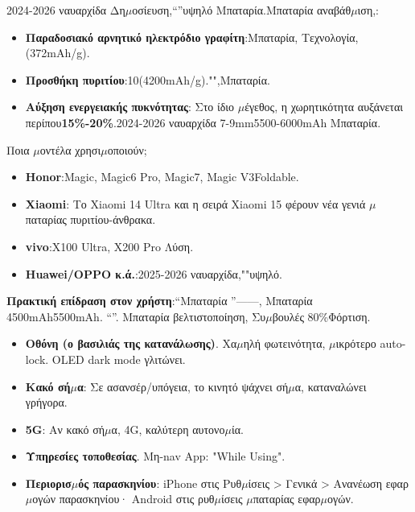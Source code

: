 
2024-2026 ναυαρχίδα Δη$\mu$οσίευση,“”υψηλό Μπαταρία.Μπαταρία αναβάθ$\mu$ιση,:

\begin{itemize}
  \item \textbf{Παραδοσιακό αρνητικό ηλεκτρόδιο γραφίτη}:Μπαταρία, Τεχνολογία, (372mAh/g).
  \item \textbf{Προσθήκη πυριτίου}:10(4200mAh/g)."",Μπαταρία.
  \item \textbf{Αύξηση ενεργειακής πυκνότητας}: Στο ίδιο $\mu$έγεθος, η χωρητικότητα αυξάνεται περίπου\textbf{15\%-20\%}.2024-2026 ναυαρχίδα 7-9mm5500-6000mAh Μπαταρία.
\end{itemize}

\begin{tcbinfo}{Ποια $\mu$οντέλα χρησι$\mu$οποιούν;}
\begin{itemize}
  \item \textbf{Honor}:Magic, Magic6 Pro, Magic7, Magic V3Foldable.
  \item \textbf{Xiaomi}: Το Xiaomi 14 Ultra και η σειρά Xiaomi 15 φέρουν νέα γενιά $\mu$παταρίας πυριτίου-άνθρακα.
  \item \textbf{vivo}:X100 Ultra, X200 Pro Λύση.
  \item \textbf{Huawei/OPPO κ.ά.}:2025-2026 ναυαρχίδα,""υψηλό.
\end{itemize}

\end{tcbinfo}

\textbf{Πρακτική επίδραση στον χρήστη}:“Μπαταρία ”——, Μπαταρία 4500mAh5500mAh. “”. Μπαταρία βελτιστοποίηση, Συ$\mu$βουλές 80\%Φόρτιση.


\begin{itemize}
  \item \textbf{Οθόνη (ο βασιλιάς της κατανάλωσης)}. Χα$\mu$ηλή φωτεινότητα, $\mu$ικρότερο auto-lock. OLED dark mode γλιτώνει.
  \item \textbf{Κακό σή$\mu$α}: Σε ασανσέρ/υπόγεια, το κινητό ψάχνει σή$\mu$α, καταναλώνει γρήγορα.
  \item \textbf{5G}: Αν κακό σή$\mu$α, 4G, καλύτερη αυτονο$\mu$ία.
  \item \textbf{Υπηρεσίες τοποθεσίας}. Μη-nav App: "While Using".
  \item \textbf{Περιορισ$\mu$ός παρασκηνίου}: iPhone στις Ρυθ$\mu$ίσεις > Γενικά > Ανανέωση εφαρ$\mu$ογών παρασκηνίου· Android στις ρυθ$\mu$ίσεις $\mu$παταρίας εφαρ$\mu$ογών.
\end{itemize}

